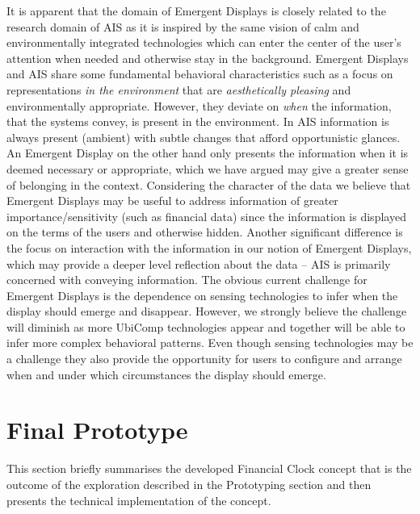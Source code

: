 It is apparent that the domain of Emergent Displays is closely related to the research domain of AIS as it is inspired by the same vision of calm and environmentally integrated technologies which can enter the center of the user’s attention when needed and otherwise stay in the background. Emergent Displays and AIS share some fundamental behavioral characteristics such as a focus on representations \emph{in the environment} that are \emph{aesthetically pleasing} and environmentally appropriate. However, they deviate on \emph{when} the information, that the systems convey, is present in the environment. In AIS information is always present (ambient) with subtle changes that afford opportunistic glances. An Emergent Display on the other hand only presents the information when it is deemed necessary or appropriate, which we have argued may give a greater sense of belonging in the context. Considering the character of the data we believe that Emergent Displays may be useful to address information of greater importance/sensitivity (such as financial data) since the information is displayed on the terms of the users and otherwise hidden. Another significant difference is the focus on interaction with the information in our notion of Emergent Displays, which may provide a deeper level reflection about the data -- AIS is primarily concerned with conveying information. The obvious current challenge for Emergent Displays is the dependence on sensing technologies to infer when the display should emerge and disappear. However, we strongly believe the challenge will diminish as more UbiComp technologies appear and together will be able to infer more complex behavioral patterns. Even though sensing technologies may be a challenge they also provide the opportunity for users to configure and arrange when and under which circumstances the display should emerge.

\section{Final Prototype}
This section briefly summarises the developed Financial Clock concept that is the outcome of the exploration described in the Prototyping section and then presents the technical implementation of the concept.

